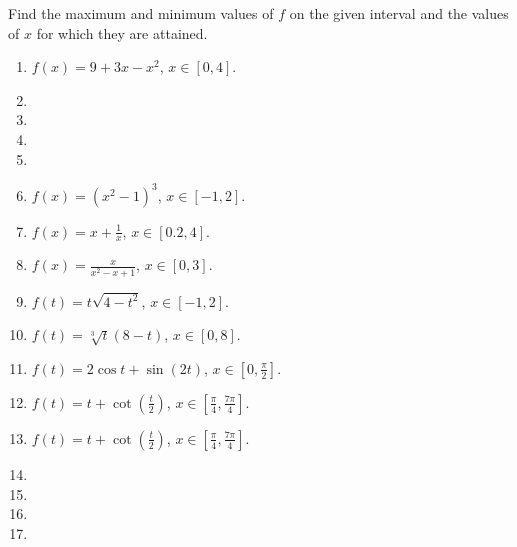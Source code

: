 Find the maximum and minimum values of $f$ on the given interval and the values of $x$ for which they are attained.
\begin{multicols}{2}
\begin{enumerate}[ref={\fcProblemRef}]
\item $\displaystyle f(x)=9+3x-x^2$, $x\in [0,4]$.

\item 
\item 
\item 
\item 
\item $\displaystyle f(x)=(x^2-1)^3$, $x\in [-1, 2]$.

\item $\displaystyle f(x)=x+\frac{1}{x}$, $x\in [0.2,4 ]$.

\item $\displaystyle f(x)=\frac{x}{x^2-x+1}$, $x\in [0,3 ]$.

\item $\displaystyle f(t)=t\sqrt{4-t^2}$, $x\in [-1,2 ]$.

\item $\displaystyle f(t)=\sqrt[3]{t}(8-t) $, $x\in [0,8 ]$.

\item $\displaystyle f(t)=2\cos t+\sin (2t)$, $x\in [0,\frac{\pi}{2} ]$.

\item $\displaystyle f(t)=t+\cot \left(\frac{t}{2}\right) $, $x\in [\frac{\pi}{4},\frac{7\pi}{4} ]$.


\item $\displaystyle f(t)=t+\cot \left(\frac{t}{2}\right) $, $x\in [\frac{\pi}{4},\frac{7\pi}{4} ]$.
\item 
\item 
\item 
\item 
\end{enumerate}
\end{multicols}
